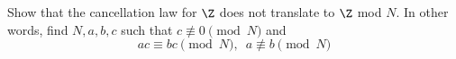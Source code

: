   Show that the cancellation law for $\Z$ does not translate to $\Z$ mod $N$.
  In other words, find $N, a, b, c$ such that $c \not\equiv 0 \pmod{N}$ and
  \[
  ac \equiv bc \pmod{N}, \,\,\, a \not\equiv b \pmod{N}
  \]
